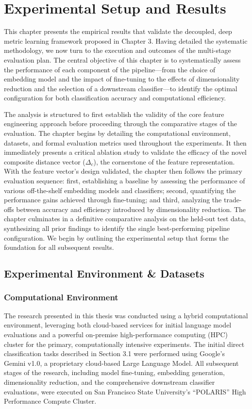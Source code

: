 \chapter{Experimental Setup and Results}
This chapter presents the empirical results that validate the decoupled, deep metric learning framework proposed in Chapter 3. Having detailed the systematic methodology, we now turn to the execution and outcomes of the multi-stage evaluation plan. The central objective of this chapter is to systematically assess the performance of each component of the pipeline---from the choice of embedding model and the impact of fine-tuning to the effects of dimensionality reduction and the selection of a downstream classifier---to identify the optimal configuration for both classification accuracy and computational efficiency.

The analysis is structured to first establish the validity of the core feature engineering approach before proceeding through the comparative stages of the evaluation. The chapter begins by detailing the computational environment, datasets, and formal evaluation metrics used throughout the experiments. It then immediately presents a critical ablation study to validate the efficacy of the novel composite distance vector (\(\Delta_c\)), the cornerstone of the feature representation. With the feature vector's design validated, the chapter then follows the primary evaluation sequence: first, establishing a baseline by assessing the performance of various off-the-shelf embedding models and classifiers; second, quantifying the performance gains achieved through fine-tuning; and third, analyzing the trade-offs between accuracy and efficiency introduced by dimensionality reduction. The chapter culminates in a definitive comparative analysis on the held-out test data, synthesizing all prior findings to identify the single best-performing pipeline configuration. We begin by outlining the experimental setup that forms the foundation for all subsequent results.

\section{Experimental Environment \& Datasets}
\subsection{Computational Environment}
The research presented in this thesis was conducted using a hybrid computational environment, leveraging both cloud-based services for initial language model evaluations and a powerful on-premise high-performance computing (HPC) cluster for the primary, computationally intensive experiments. The initial direct classification tasks described in Section 3.1 were performed using Google's Gemini v1.0, a proprietary cloud-based Large Language Model. All subsequent stages of the research, including model fine-tuning, embedding generation, dimensionality reduction, and the comprehensive downstream classifier evaluations, were executed on San Francisco State University's ``POLARIS'' High Performance Compute Cluster.

